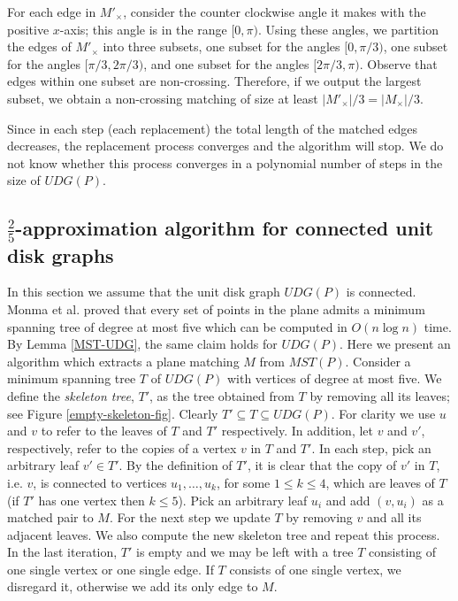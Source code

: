\documentclass[11pt,a4paper]{article}
\begin{document}
For each edge in $M'_{\times}$, consider the counter clockwise angle it makes with the positive $x$-axis; this angle is in the range $[0,\pi)$. Using these angles, we partition the edges of $M'_{\times}$ into three subsets, one subset for the angles $[0,\pi/3)$, one subset for the angles $[\pi/3,2\pi/3)$, and
one subset for the angles $[2\pi/3,\pi)$. Observe that edges within one subset are non-crossing. Therefore, if we output the largest subset, we obtain a non-crossing matching of size at least
$|M'_{\times}|/3 = |M_{\times}|/3$.

Since in each step (each replacement) the total length of the matched edges decreases, the replacement process converges and the algorithm will stop. We do not know whether this process converges in a polynomial number of steps in the size of $UDG(P)$.

\subsection{$\frac{2}{5}$-approximation algorithm for connected unit disk graphs}
\label{five-over-two-approximation}

In this section we assume that the unit disk graph $UDG(P)$ is connected. Monma et al. \cite{Monma1992} proved that every set of points in the plane admits a minimum spanning tree of degree at most five which can be computed in $O(n\log n)$ time. By Lemma \ref{MST-UDG}, the same claim holds for $UDG(P)$. Here we present an algorithm which extracts a plane matching $M$ from $MST(P)$. Consider a minimum spanning tree $T$ of $UDG(P)$ with vertices of degree at most five. We define the {\em skeleton tree}, ${T'}$, as the tree obtained from $T$ by removing all its leaves; see Figure \ref{empty-skeleton-fig}. Clearly ${T'} \subseteq T \subseteq UDG(P)$. For clarity we use $u$ and $v$ to refer to the leaves of $T$ and $T'$ respectively. In addition, let $v$ and $v'$, respectively, refer to the copies of a vertex $v$ in $T$ and $T'$. In each step, pick an arbitrary leaf $v'\in T'$. By the definition of ${T'}$, it is clear that the copy of $v'$ in $T$, i.e. $v$, is connected to vertices $u_1,\dots, u_k$, for some $1\le k \le 4$, which are leaves of $T$ (if $T'$ has one vertex then $k\le5$). Pick an arbitrary leaf $u_i$ and add $(v, u_i)$ as a matched pair to $M$. For the next step we update $T$ by removing $v$ and all its adjacent leaves. We also compute the new skeleton tree and repeat this process. 
In the last iteration, $T'$ is empty and we may be left with a tree $T$ consisting of one single vertex or one single edge. If $T$ consists of one single vertex, we disregard it, otherwise we add its only edge to $M$.
\end{document}
